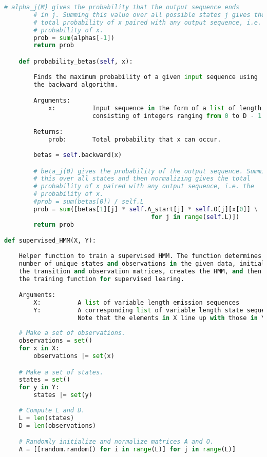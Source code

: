 \begin{lstlisting}[language=Python]
        # alpha_j(M) gives the probability that the output sequence ends
        # in j. Summing this value over all possible states j gives the
        # total probability of x paired with any output sequence, i.e. the
        # probability of x.
        prob = sum(alphas[-1])
        return prob

    def probability_betas(self, x):
        
        Finds the maximum probability of a given input sequence using
        the backward algorithm.

        Arguments:
            x:          Input sequence in the form of a list of length M,
                        consisting of integers ranging from 0 to D - 1.

        Returns:
            prob:       Total probability that x can occur.
        
        betas = self.backward(x)

        # beta_j(0) gives the probability of the output sequence. Summing
        # this over all states and then normalizing gives the total
        # probability of x paired with any output sequence, i.e. the
        # probability of x.
        #prob = sum(betas[0]) / self.L
        prob = sum([betas[1][j] * self.A_start[j] * self.O[j][x[0]] \
                                        for j in range(self.L)])
        return prob

def supervised_HMM(X, Y):
    
    Helper function to train a supervised HMM. The function determines the
    number of unique states and observations in the given data, initializes
    the transition and observation matrices, creates the HMM, and then runs
    the training function for supervised learing.

    Arguments:
        X:          A list of variable length emission sequences 
        Y:          A corresponding list of variable length state sequences
                    Note that the elements in X line up with those in Y
    
    # Make a set of observations.
    observations = set()
    for x in X:
        observations |= set(x)

    # Make a set of states.
    states = set()
    for y in Y:
        states |= set(y)
    
    # Compute L and D.
    L = len(states)
    D = len(observations)

    # Randomly initialize and normalize matrices A and O.
    A = [[random.random() for i in range(L)] for j in range(L)]


\end{lstlisting}
